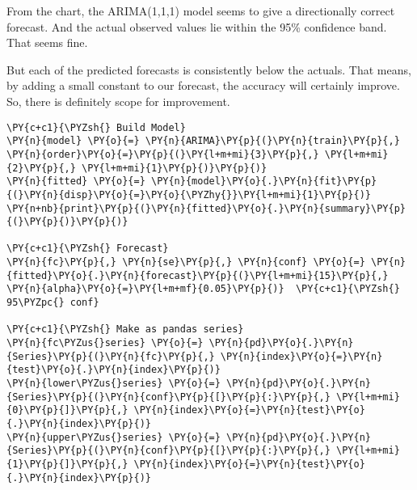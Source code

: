 \begin{center}
\end{center}
    
From the chart, the ARIMA(1,1,1) model seems to give a directionally
correct forecast. And the actual observed values lie within the 95\%
confidence band. That seems fine.

But each of the predicted forecasts is consistently below the actuals.
That means, by adding a small constant to our forecast, the accuracy
will certainly improve. So, there is definitely scope for improvement.


\begin{codebox}[breakable, size=fbox, boxrule=1pt, pad at break*=1mm,colback=cellbackground, colframe=cellborder]
\begin{Verbatim}[commandchars=\\\{\}]
\PY{c+c1}{\PYZsh{} Build Model}
\PY{n}{model} \PY{o}{=} \PY{n}{ARIMA}\PY{p}{(}\PY{n}{train}\PY{p}{,} \PY{n}{order}\PY{o}{=}\PY{p}{(}\PY{l+m+mi}{3}\PY{p}{,} \PY{l+m+mi}{2}\PY{p}{,} \PY{l+m+mi}{1}\PY{p}{)}\PY{p}{)}  
\PY{n}{fitted} \PY{o}{=} \PY{n}{model}\PY{o}{.}\PY{n}{fit}\PY{p}{(}\PY{n}{disp}\PY{o}{=}\PY{o}{\PYZhy{}}\PY{l+m+mi}{1}\PY{p}{)}  
\PY{n+nb}{print}\PY{p}{(}\PY{n}{fitted}\PY{o}{.}\PY{n}{summary}\PY{p}{(}\PY{p}{)}\PY{p}{)}

\PY{c+c1}{\PYZsh{} Forecast}
\PY{n}{fc}\PY{p}{,} \PY{n}{se}\PY{p}{,} \PY{n}{conf} \PY{o}{=} \PY{n}{fitted}\PY{o}{.}\PY{n}{forecast}\PY{p}{(}\PY{l+m+mi}{15}\PY{p}{,} \PY{n}{alpha}\PY{o}{=}\PY{l+m+mf}{0.05}\PY{p}{)}  \PY{c+c1}{\PYZsh{} 95\PYZpc{} conf}

\PY{c+c1}{\PYZsh{} Make as pandas series}
\PY{n}{fc\PYZus{}series} \PY{o}{=} \PY{n}{pd}\PY{o}{.}\PY{n}{Series}\PY{p}{(}\PY{n}{fc}\PY{p}{,} \PY{n}{index}\PY{o}{=}\PY{n}{test}\PY{o}{.}\PY{n}{index}\PY{p}{)}
\PY{n}{lower\PYZus{}series} \PY{o}{=} \PY{n}{pd}\PY{o}{.}\PY{n}{Series}\PY{p}{(}\PY{n}{conf}\PY{p}{[}\PY{p}{:}\PY{p}{,} \PY{l+m+mi}{0}\PY{p}{]}\PY{p}{,} \PY{n}{index}\PY{o}{=}\PY{n}{test}\PY{o}{.}\PY{n}{index}\PY{p}{)}
\PY{n}{upper\PYZus{}series} \PY{o}{=} \PY{n}{pd}\PY{o}{.}\PY{n}{Series}\PY{p}{(}\PY{n}{conf}\PY{p}{[}\PY{p}{:}\PY{p}{,} \PY{l+m+mi}{1}\PY{p}{]}\PY{p}{,} \PY{n}{index}\PY{o}{=}\PY{n}{test}\PY{o}{.}\PY{n}{index}\PY{p}{)}


\end{Verbatim}
\end{codebox}
